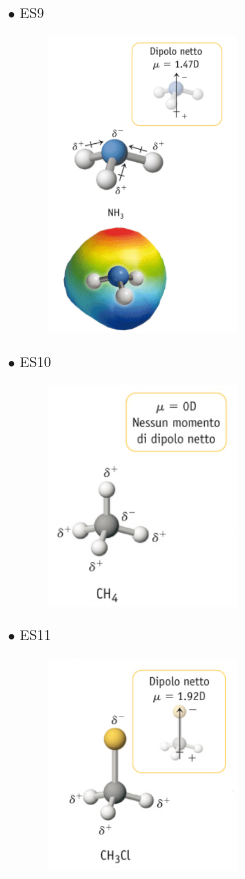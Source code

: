 $\bullet$ ES9

\begin{figure}[htp]
    \centering
    \includegraphics[width=5cm]{immagini/NH_3.png}
\end{figure}

$\bullet$ ES10

\begin{figure}[htp]
    \centering
    \includegraphics[width=5cm]{immagini/CH_4.png}
\end{figure}

$\bullet$ ES11

\begin{figure}[htp]
    \centering
    \includegraphics[width=5cm]{immagini/CH_3Cl.png}
\end{figure}

